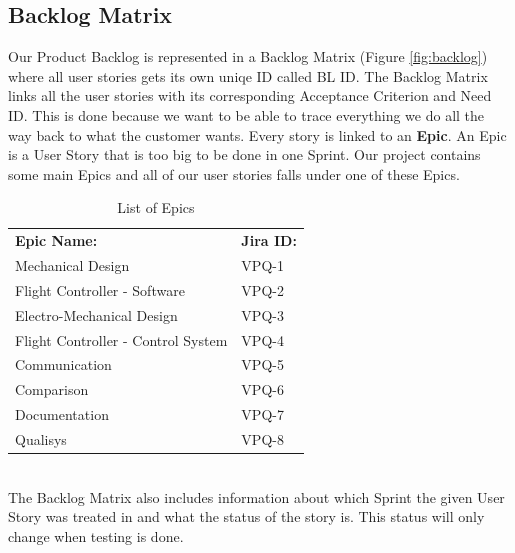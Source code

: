 \subsection{Backlog Matrix}
Our Product Backlog is represented in a Backlog Matrix (Figure \ref{fig:backlog}) where all user stories gets its own uniqe ID called BL ID. The Backlog Matrix links all the user stories with its corresponding Acceptance Criterion and Need ID. This is done because we want to be able to trace everything we do all the way back to what the customer wants. Every story is linked to an \textbf{Epic}. An Epic is a User Story that is too big to be done in one Sprint. Our project contains some main Epics and all of our user stories falls under one of these Epics. 

\begin{table}[h]
\begin{center}
\caption{List of Epics}
\begin{tabular}{l|l}
     \rowcolor{cadetgrey} \textbf{Epic Name:}      & \textbf{Jira ID:} \\
                        Mechanical Design                       & VPQ-1 \\  
\rowcolor{gainsboro}    Flight Controller - Software            & VPQ-2 \\  
                        Electro-Mechanical Design               & VPQ-3 \\  
\rowcolor{gainsboro}    Flight Controller - Control System      & VPQ-4 \\  
                        Communication                           & VPQ-5 \\  
\rowcolor{gainsboro}    Comparison                              & VPQ-6 \\  
                        Documentation                           & VPQ-7 \\  
\rowcolor{gainsboro}    Qualisys                                & VPQ-8 \\ 
                           
\end{tabular}
\end{center}
\end{table}
\\ 
\noindent The Backlog Matrix also includes information about which Sprint the given User Story was treated in and what the status of the story is. This status will only change when testing is done.  

